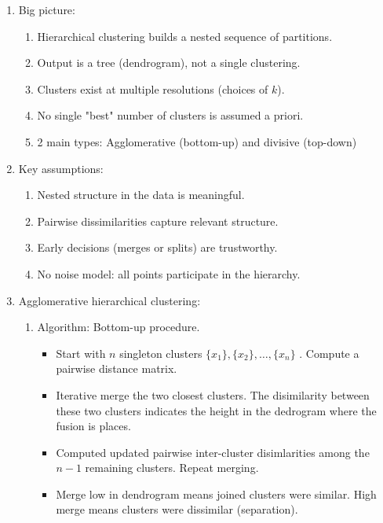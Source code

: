 \documentclass{article}
\begin{document}
\begin{enumerate}
\item Big picture:
\begin{enumerate}
\item Hierarchical clustering builds a nested sequence of partitions.
\item Output is a tree (dendrogram), not a single clustering.
\item Clusters exist at multiple resolutions (choices of $k$).
\item No single "best" number of clusters is assumed a priori.
\item 2 main types: Agglomerative (bottom-up) and divisive (top-down)
\end{enumerate}

\item Key assumptions:
\begin{enumerate}
\item Nested structure in the data is meaningful.
\item Pairwise dissimilarities capture relevant structure.
\item Early decisions (merges or splits) are trustworthy.
\item No noise model: all points participate in the hierarchy.
\end{enumerate}

\item Agglomerative hierarchical clustering:
\begin{enumerate}
\item Algorithm: Bottom-up procedure.
\begin{itemize}
\item Start with $n$ singleton clusters $\{x_1\}, \{x_2\}, \dots , \{x_n\}$ . Compute a pairwise distance matrix. 
\item Iterative merge the two closest clusters. The disimilarity between these two clusters indicates the height in the dedrogram where the fusion is places.
\item Computed updated pairwise inter-cluster disimlarities among the $n-1$ remaining clusters. Repeat merging.
\item Merge low in dendrogram means joined clusters were similar. High merge means clusters were dissimilar (separation).
\end{itemize}


\end{enumerate}
\end{enumerate}
\end{document}
